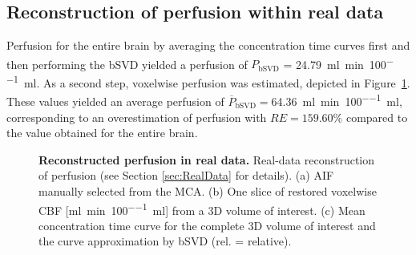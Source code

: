 \documentclass[10pt]{article}
\begin{document}

	
	\subsection{Reconstruction of perfusion within real data}\label{sec:resultsrealdata}
	 Perfusion for the entire brain by averaging the concentration time curves first and then performing the bSVD yielded a perfusion of $P_{\mathrm{bSVD}}$ = \SI{24.79}{\milli\litre\per\minute\per100\milli\litre}. As a second step, voxelwise perfusion was estimated, depicted in Figure~\ref{fig:RealData}. These values yielded an average perfusion of $\overline{P}_{\mathrm{bSVD}} = $\SI{64.36}{\milli\litre\per\minute\per100\milli\litre}, corresponding to an overestimation of perfusion with $RE = 159.60\%$ compared to the value obtained for the entire brain.	


\begin{figure}[!h]
\caption{{\bf Reconstructed perfusion in real data.}
Real-data reconstruction of perfusion (see Section \ref{sec:RealData} for details). (a) AIF manually selected from the MCA. (b) One slice of restored voxelwise CBF [\si{\milli\litre\per\minute\per100\milli\litre}] from a 3D volume of interest. (c) Mean concentration time curve for the complete 3D volume of interest and the curve approximation by bSVD (rel. = relative).}
\label{fig:RealData}
\end{figure}
\end{document}
